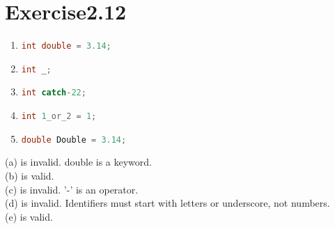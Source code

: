 \documentclass{article}
\begin{document}
    
\section*{Exercise2.12}

\begin{enumerate}[label=(\alph*)]
\item \lstinline[language=C++]|int double = 3.14;|
\item \lstinline[language=C++]|int _;|
\item \lstinline[language=C++]|int catch-22;|
\item \lstinline[language=C++]|int 1_or_2 = 1;|
\item \lstinline[language=C++]|double Double = 3.14;|
\end{enumerate}

\begin{flushleft}
(a) is invalid. double is a keyword. \\
(b) is valid. \\
(c) is invalid. '-' is an operator. \\
(d) is invalid. Identifiers must start with letters or underscore, not numbers. \\
(e) is valid.
\end{flushleft}
\end{document}
